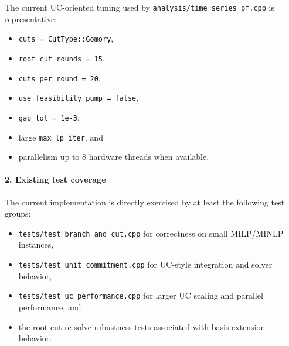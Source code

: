 The current UC-oriented tuning used by \texttt{analysis/time\_series\_pf.cpp} is representative:
\begin{itemize}
  \item \texttt{cuts = CutType::Gomory},
  \item \texttt{root\_cut\_rounds = 15},
  \item \texttt{cuts\_per\_round = 20},
  \item \texttt{use\_feasibility\_pump = false},
  \item \texttt{gap\_tol = 1e-3},
  \item large \texttt{max\_lp\_iter}, and
  \item parallelism up to 8 hardware threads when available.
\end{itemize}

\paragraph{2. Existing test coverage}
The current implementation is directly exercised by at least the following test groups:
\begin{itemize}
  \item \texttt{tests/test\_branch\_and\_cut.cpp} for correctness on small MILP/MINLP instances,
  \item \texttt{tests/test\_unit\_commitment.cpp} for UC-style integration and solver behavior,
  \item \texttt{tests/test\_uc\_performance.cpp} for larger UC scaling and parallel performance, and
  \item the root-cut re-solve robustness tests associated with basis extension behavior.
\end{itemize}

